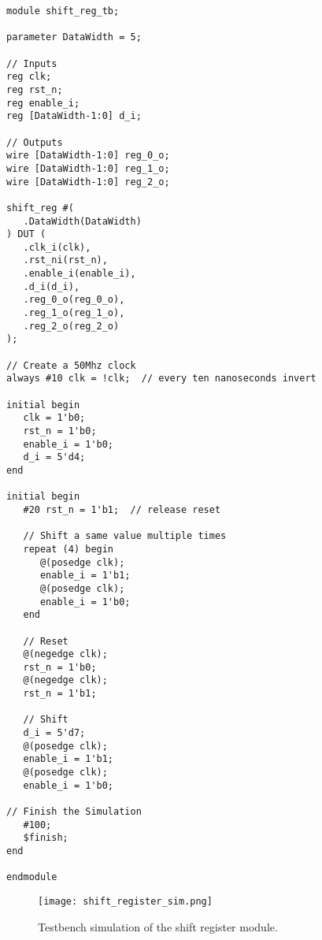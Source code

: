 \begin{verbatim}
module shift_reg_tb;

parameter DataWidth = 5;

// Inputs
reg clk;
reg rst_n;
reg enable_i;
reg [DataWidth-1:0] d_i;

// Outputs
wire [DataWidth-1:0] reg_0_o;
wire [DataWidth-1:0] reg_1_o;
wire [DataWidth-1:0] reg_2_o;

shift_reg #(
   .DataWidth(DataWidth)
) DUT (
   .clk_i(clk),
   .rst_ni(rst_n),
   .enable_i(enable_i),
   .d_i(d_i),
   .reg_0_o(reg_0_o),
   .reg_1_o(reg_1_o),
   .reg_2_o(reg_2_o)
);

// Create a 50Mhz clock
always #10 clk = !clk;  // every ten nanoseconds invert

initial begin
   clk = 1'b0;
   rst_n = 1'b0;
   enable_i = 1'b0;
   d_i = 5'd4;
end

initial begin
   #20 rst_n = 1'b1;  // release reset

   // Shift a same value multiple times
   repeat (4) begin
      @(posedge clk);
      enable_i = 1'b1;
      @(posedge clk);
      enable_i = 1'b0;
   end

   // Reset
   @(negedge clk);
   rst_n = 1'b0;
   @(negedge clk);
   rst_n = 1'b1;

   // Shift
   d_i = 5'd7;
   @(posedge clk);
   enable_i = 1'b1;
   @(posedge clk);
   enable_i = 1'b0;

// Finish the Simulation
   #100;
   $finish;
end

endmodule
\end{verbatim}

\begin{figure}[htbp]
   \centering
   \texttt{[image: shift\_register\_sim.png]}
   \caption{Testbench simulation of the shift register module.}
   \label{fig:shift_register_sim}
\end{figure}
